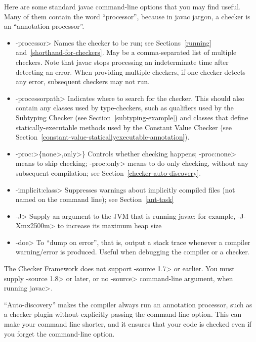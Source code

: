 Here are some standard javac command-line options that you may find useful.
Many of them contain the word ``processor'', because in javac jargon, a
checker is an ``annotation processor''.

\begin{itemize}
\item \<-processor> Names the checker to be
  run; see Sections~\ref{running} and~\ref{shorthand-for-checkers}.
  May be a comma-separated list of multiple checkers.  Note that javac
  stops processing an indeterminate time after detecting an error.  When
  providing multiple checkers, if one checker detects any error, subsequent
  checkers may not run.
\item \<-processorpath> Indicates where to search for the
  checker.  This should also contain any classes used by type-checkers,
  such as qualifiers used by the Subtyping Checker (see
  Section~\ref{subtyping-example}) and classes that define
  statically-executable methods used by the Constant Value Checker (see
  Section~\ref{constant-value-staticallyexecutable-annotation}).
\item \<-proc:>\{\<none>,\<only>\} Controls whether checking
  happens; \<-proc:none>
  means to skip checking; \<-proc:only> means to do only
  checking, without any subsequent compilation; see
  Section~\ref{checker-auto-discovery}.
\item \<-implicit:class> Suppresses warnings about implicitly compiled files
  (not named on the command line); see Section~\ref{ant-task}
\item \<-J> Supply an argument to the JVM that is running javac;
  for example, \<-J-Xmx2500m> to increase its maximum heap size
\item \<-doe> To ``dump on error'', that is, output a stack trace
  whenever a compiler warning/error is produced. Useful when debugging
  the compiler or a checker.
\end{itemize}

The Checker Framework does not support \<-source 1.7> or earlier.  You must
supply \<-source 1.8> or later, or no \<-source> command-line argument,
when running \<javac>.



``Auto-discovery'' makes the  compiler always run an
annotation processor, such as a checker
plugin without explicitly passing the 
command-line option.  This can make your command line shorter, and it ensures
that your code is checked even if you forget the command-line option.

